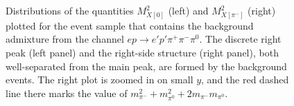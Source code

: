 \begin{figure}[htp]
\begin{center}
\caption{\small Distributions of the quantities $M_{X[0]}^{2}$ (left) and $M_{X[\pi^{-}]}^{2}$ (right) plotted for the event sample that contains the background admixture from the channel $ep\rightarrow e'p'\pi^{+}\pi^{-}\pi^{0}$. The discrete right peak (left panel) and the right-side structure (right panel), both well-separated from the main peak, are formed by the background events. The right plot is zoomed in on small $y$, and the red dashed line there marks the value of $m_{\pi^{-}}^{2} + m_{\pi^{0}}^{2}+2m_{\pi^{-}}m_{\pi^{0}}$.   } \label{fig:mm_backgr}
\end{center}
\end{figure}


